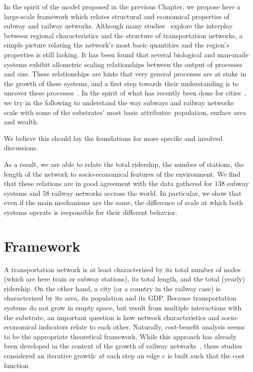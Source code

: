 In the spirit of the model proposed in the previous Chapter, we propose here a
large-scale framework which relates structural and economical properties of
subway and railway networks. Although many
studies~\cite{Kansky:1963,Derrible:2009,Levinson:2012} explore the interplay
between regional characteristics and the structure of transportation networks, a
simple picture relating the network's most basic quantities and the region's
properties is still lacking. It has been found that several biological and
man-made systems exhibit allometric scaling relationships between the output of
processes and size. These relationships are hints that very general processes
are at stake in the growth of these systems, and a first step towards their
understanding is to uncover these
processes~\cite{Banavar:1999,Louf:2014_mobility}. In
the spirit of what has recently been done for cities~\cite{Louf:2014_mobility}, we try in
the following to understand the way subways and railway networks scale with some
of the substrates' most basic attributes: population, surface area and wealth. 

We believe this should lay the foundations for more specific and involved discussions.

As a result, we are able to relate the total ridership, the number of stations,
the length of the network to socio-economical features of the environment. We
find that these relations are in good agreement with the data gathered for $138$
subway systems and $58$ railway networks accross the world. In particular, we
show that even if the main mechanisms are the same, the difference of scale at
which both systems operate is responsible for their different behavior. 


\section{Framework}

A transportation network is at least characterized by its total number of nodes
(which are here train or subway stations), its total length, and the total
(yearly) ridership. On the other hand, a city (or a country in the railway case)
is characterized by its area, its population and its GDP. Because transportation
systems do not grow in empty space, but result from multiple interactions with
the substrate, an important question is how network characteristics and
socio-economical indicators relate to each other. Naturally, cost-benefit
analysis seems to be the appropriate theoretical framework. While this approach
has already been developed in the context of the growth of railway
networks~\cite{Black:1971,Louf:2013_emergence}, these studies considered an iterative
growth: at each step an edge $e$ is built such that the cost function

